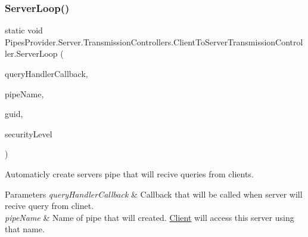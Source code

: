 \subsubsection{\texorpdfstring{Server\+Loop()}{ServerLoop()}\hspace{0.1cm}{\footnotesize\ttfamily [1/4]}}
{\footnotesize\ttfamily static void Pipes\+Provider.\+Server.\+Transmission\+Controllers.\+Client\+To\+Server\+Transmission\+Controller.\+Server\+Loop (\begin{DoxyParamCaption}\item[{System.\+Action$<$ \mbox{\hyperlink{class_pipes_provider_1_1_server_1_1_transmission_controllers_1_1_base_server_transmission_controller}{Base\+Server\+Transmission\+Controller}}, string $>$}]{query\+Handler\+Callback,  }\item[{string}]{pipe\+Name,  }\item[{out string}]{guid,  }\item[{\mbox{\hyperlink{namespace_pipes_provider_1_1_security_a1a6020eca1c661a6f7140e8260502d7e}{Security.\+Security\+Level}}}]{security\+Level }\end{DoxyParamCaption})\hspace{0.3cm}{\ttfamily [static]}}



Automaticly create server\textquotesingle{}s pipe that will recive queries from clients. 


\begin{DoxyParams}{Parameters}
{\em query\+Handler\+Callback} & Callback that will be called when server will recive query from clinet.\\
\hline
{\em pipe\+Name} & Name of pipe that will created. \mbox{\hyperlink{namespace_pipes_provider_1_1_client}{Client}} will access this server using that name.\\
\hline
\end{DoxyParams}
\mbox{\label{class_pipes_provider_1_1_server_1_1_transmission_controllers_1_1_client_to_server_transmission_controller_ab52c0b0e04e34cd795847eef1e59d35b}} 
